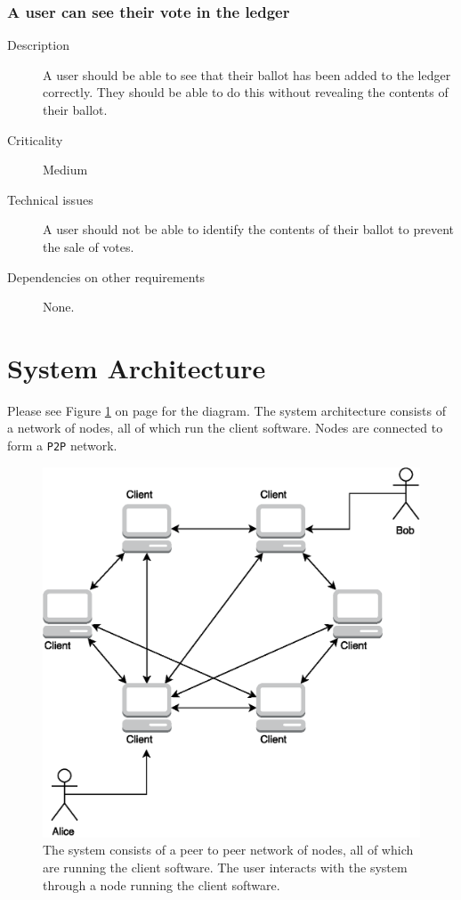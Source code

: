 \documentclass[a4paper,12pt]{article}
\begin{document}
\subsubsection{A user can see their vote in the ledger}
\label{sssec:vote-sys-view}
\begin{description}
	\item[Description]
		A user should be able to see that their ballot has been added to the ledger correctly. They should be able to do this without revealing the contents of their ballot.
	\item[Criticality]
		Medium
	\item[Technical issues]
		A user should not be able to identify the contents of their ballot to prevent the sale of votes.
	\item[Dependencies on other requirements]
		None.
\end{description}

\section{System Architecture}
Please see Figure \ref{fig:system-architecture} on page \pageref{fig:system-architecture} for the diagram. The system architecture consists of a network of nodes, all of which run the client software. Nodes are connected to form a \texttt{P2P} network.

\begin{figure}[ht]
\centering
\includegraphics[width=\textwidth]{SystemArchitecture.eps}
\caption{The system consists of a peer to peer network of nodes, all of which are running the client software. The user interacts with the system through a node running the client software.}
\label{fig:system-architecture}
\end{figure}
\end{document}
